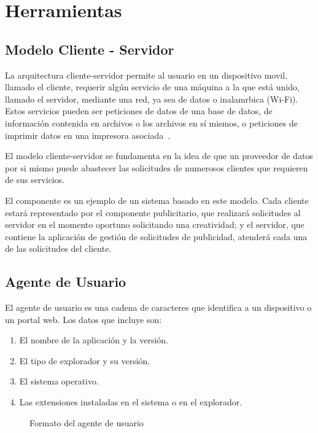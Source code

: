 \section{Herramientas}


\subsection{Modelo Cliente - Servidor}

La arquitectura cliente-servidor permite al usuario en un dispositivo
movil, llamado el cliente, requerir algún servicio de una máquina
a la que está unido, llamado el servidor, mediante una red, ya sea
de datos o inalamrbica (Wi-Fi). Estos servicios pueden ser peticiones
de datos de una base de datos, de información contenida en archivos
o los archivos en sí mismos, o peticiones de imprimir datos en una
impresora asociada~\cite{Cap2.ClienteServidor}.

El modelo cliente-servidor se fundamenta en la idea de que un proveedor
de datos por si mismo puede abastecer las solicitudes de numerosos
clientes que requieren de sus servicios.

El componente es un ejemplo de un sistema basado en este modelo. Cada
cliente estará representado por el componente publicitario, que realizará
solicitudes al servidor en el momento oportuno solicitando una creatividad;
y el servidor, que contiene la aplicación de gestión de solicitudes
de publicidad, atenderá cada una de las solicitudes del cliente.


\subsection{Agente de Usuario}

El agente de usuario es una cadena de caracteres que identifica a
un dispositivo o un portal web. Los datos que incluye son:
\begin{enumerate}
\item El nombre de la aplicación y la versión.
\item El tipo de explorador y su versión.
\item El sistema operativo.
\item Las extensiones instaladas en el sistema o en el explorador.
\end{enumerate}
\begin{figure}[h]

\caption{Formato del agente de usuario \cite{Cap2.Useragent}}
\end{figure}




